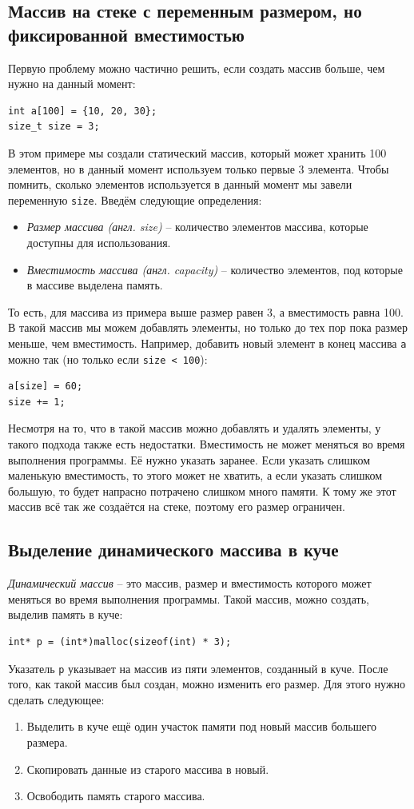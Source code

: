 \documentclass[10pt]{article}
\begin{document}
\subsection*{Массив на стеке с переменным размером, но фиксированной вместимостью}
Первую проблему можно частично решить, если создать массив больше, чем нужно на данный момент:
\begin{lstlisting}
int a[100] = {10, 20, 30};
size_t size = 3;
\end{lstlisting}
В этом примере мы создали статический массив, который может хранить 100 элементов, но в данный момент используем только первые 3 элемента. Чтобы помнить, сколько элементов используется в данный момент мы завели переменную \texttt{size}. Введём следующие определения:
\begin{itemize}
\item \textit{Размер массива (англ. size)} -- количество элементов массива, которые доступны для использования.
\item \textit{Вместимость массива (англ. capacity)} -- количество элементов, под которые в массиве выделена память.
\end{itemize}
То есть, для массива из примера выше размер равен 3, а вместимость равна 100.
В такой массив мы можем добавлять элементы, но только до тех пор пока размер меньше, чем вместимость. Например, добавить новый элемент в конец массива \texttt{a} можно так (но только если \texttt{size < 100}):
\begin{lstlisting}
a[size] = 60;
size += 1;
\end{lstlisting}
Несмотря на то, что в такой массив можно добавлять и удалять элементы, у такого подхода также есть недостатки. Вместимость не может меняться во время выполнения программы. Её нужно указать заранее. Если указать слишком маленькую вместимость, то этого может не хватить, а если указать слишком большую, то будет напрасно потрачено слишком много памяти. К тому же этот массив всё так же создаётся на стеке, поэтому его размер ограничен.

\subsection*{Выделение динамического массива в куче}
\textit{Динамический массив} -- это массив, размер и вместимость которого может меняться во время выполнения программы. Такой массив, можно создать, выделив память в куче:
\begin{lstlisting}
int* p = (int*)malloc(sizeof(int) * 3);
\end{lstlisting}
Указатель \texttt{p} указывает на массив из пяти элементов, созданный в куче.
После того, как такой массив был создан, можно изменить его размер. Для этого нужно сделать следующее:
\begin{enumerate}
\item Выделить в куче ещё один участок памяти под новый массив большего размера.
\item Скопировать данные из старого массива в новый.
\item Освободить память старого массива.
\end{enumerate}
\end{document}
